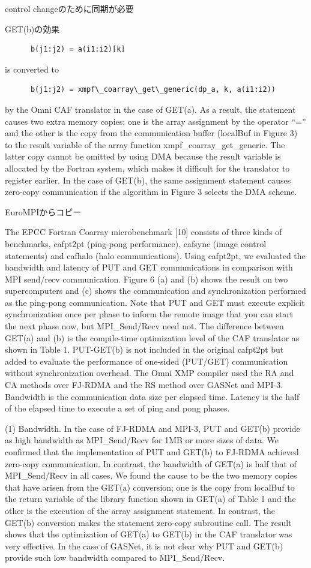 control changeのために同期が必要

GET(b)の効果
\begin{verbatim}
      b(j1:j2) = a(i1:i2)[k] 
\end{verbatim}
is converted to
\begin{verbatim}
      b(j1:j2) = xmpf\_coarray\_get\_generic(dp_a, k, a(i1:i2)) 
\end{verbatim}
by the Omni CAF translator in the case of GET(a). As a result, the statement 
causes two extra memory copies; one is the array assignment by the operator “=” 
and the other is the copy from the communication buffer (localBuf in Figure 3)
 to the result variable of the array function xmpf\_coarray\_get\_generic. The latter 
copy cannot be omitted by using DMA because the result variable is allocated by 
the Fortran system, which makes it difficult for the translator to register earlier. 
In the case of GET(b), the same assignment statement causes zero-copy communication 
if the algorithm in Figure 3 selects the DMA scheme.





EuroMPIからコピー

The EPCC Fortran Coarray microbenchmark [10] consists of three kinds of benchmarks, cafpt2pt (ping-pong performance), cafsync (image control statements) and cafhalo (halo communications). Using cafpt2pt, we evaluated the bandwidth and latency of PUT and GET communications in comparison with MPI send/recv communication. Figure 6 (a) and (b) shows the result on two supercomputers and (c) shows the communication and synchronization performed as the ping-pong communication. Note that PUT and GET must execute explicit synchronization once per phase to inform the remote image that you can start the next phase now, but MPI\_Send/Recv need not. The difference between GET(a) and (b) is the compile-time optimization level of the CAF translator as shown in Table 1. PUT-GET(b) is not included in the original cafpt2pt but added to evaluate the performance of one-sided (PUT/GET) communication without synchronization overhead. The Omni XMP compiler used the RA and CA methods over FJ-RDMA and the RS method over GASNet and MPI-3. Bandwidth is the communication data size per elapsed time. Latency is the half of the elapsed time to execute a set of ping and pong phases.

(1) Bandwidth. In the case of FJ-RDMA and MPI-3, PUT and GET(b) provide as high bandwidth as MPI\_Send/Recv for 1MB or more sizes of data. We confirmed that the implementation of PUT and GET(b) to FJ-RDMA achieved zero-copy communication. In contrast, the bandwidth of GET(a) is half that of MPI\_Send/Recv in all cases. We found the cause to be the two memory copies that have arisen from the GET(a) conversion; one is the copy from localBuf to the return variable of the library function shown in GET(a) of Table 1 and the other is the execution of the array assignment statement. In contrast, the GET(b) conversion makes the statement zero-copy subroutine call. The result shows that the optimization of GET(a) to GET(b) in the CAF translator was very effective. In the case of GASNet, it is not clear why PUT and GET(b) provide such low bandwidth compared to MPI\_Send/Recv. 


